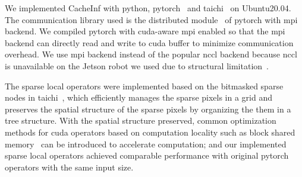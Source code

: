 We implemented CacheInf with python, pytorch~\cite{paszke2017automatic} and taichi~\cite{taichi} on Ubuntu20.04.
The communication library used is the distributed module~\cite{torch_distributed} of pytorch with mpi backend.
We compiled pytorch with cuda-aware mpi enabled so that the mpi backend can directly read and write to cuda buffer to minimize communication overhead.
We use mpi backend instead of the popular nccl backend because nccl is unavailable on the Jetson robot we used due to structural limitation~\cite{noauthor_can_2022}.

The sparse local operators were implemented based on the bitmasked sparse nodes in taichi~\cite{taichi}, which efficiently manages the sparse pixels in a grid and preserves the spatial structure of the sparse pixels by organizing the them in a tree structure. 
With the spatial structure preserved, common optimization methods for cuda operators based on computation locality such as block shared memory~\cite{noauthor_using_2013} can be introduced to accelerate computation; and our implemented sparse local operators achieved comparable performance with original pytorch operators with the same input size.
